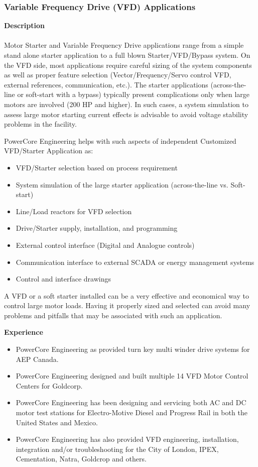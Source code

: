 \subsubsection{Variable Frequency Drive (VFD) Applications}
\label{Sub:Exp:VFD}

\textbf{Description}\\
\\
Motor Starter and Variable Frequency Drive applications range from a simple stand alone starter application to a full blown Starter/VFD/Bypass system. On the VFD side, most applications require careful sizing of the system components as well as proper feature selection (Vector/Frequency/Servo control VFD, external references, communication, etc.). The starter applications (across-the-line or soft-start with a bypass) typically present complications only when large motors are involved (200 HP and higher). In such cases, a system simulation to assess large motor starting current effects is advisable to avoid voltage stability problems in the facility. 

PowerCore Engineering helps with such aspects of independent Customized VFD/Starter Application as: 
\begin{itemize}
	\item VFD/Starter selection based on process requirement
	\item System simulation of the large starter application (across-the-line vs. Soft-start)
	\item Line/Load reactors for VFD selection
	\item Drive/Starter supply, installation, and programming
	\item External control interface (Digital and Analogue controls)
	\item Communication interface to external SCADA or energy management systems
	\item Control and interface drawings
\end{itemize}

A VFD or a soft starter installed can be a very effective and economical way to control large motor loads. Having it properly sized and selected can avoid many problems and pitfalls that may be associated with such an application.

\textbf{Experience}\\
\begin{itemize}
	\item PowerCore Engineering as provided turn key multi winder drive systems for AEP Canada.
	\item PowerCore Engineering designed and built multiple 14 VFD Motor Control Centers for Goldcorp.
	\item PowerCore Engineering has been designing and servicing both AC and DC motor test stations for Electro-Motive Diesel and Progress Rail in both the United States and Mexico. 
	\item PowerCore Engineering has also provided VFD engineering, installation, integration and/or troubleshooting for the City of London, IPEX, Cementation, Natra, Goldcrop and others.
\end{itemize}
	
